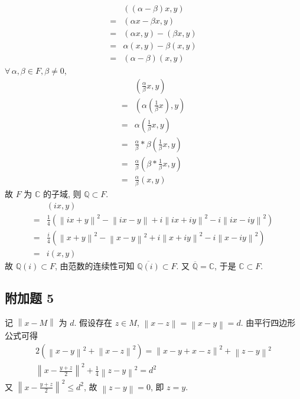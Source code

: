 \documentclass[../main.tex]{subfiles}
\begin{document}
\begin{align*}
     & \left( \left( \alpha - \beta \right) x , y \right) \\
    =& \left( \alpha x - \beta x , y \right) \\
    =& \left( \alpha x, y \right) - \left( \beta x, y \right) \\
    =& \alpha \left( x, y \right) - \beta \left( x, y \right) \\
    =& \left( \alpha - \beta \right) \left( x, y \right)
\end{align*}
$\forall \, \alpha, \beta \in F, \beta \neq 0$,
\begin{align*}
     & \left( \frac{\alpha}{\beta} x, y \right) \\
    =& \left( \alpha \left( \frac{1}{\beta} x \right) , y \right) \\
    =& \alpha \left( \frac{1}{\beta} x , y \right) \\
    =& \frac{\alpha}{\beta} * \beta \left( \frac{1}{\beta} x, y \right) \\
    =& \frac{\alpha}{\beta} \left( \beta * \frac{1}{\beta} x, y \right) \\
    =& \frac{\alpha}{\beta} \left( x, y \right)
\end{align*}
故 $F$ 为 $\mathbb{C}$ 的子域, 则 $\mathbb{Q} \subset F$.
\begin{align*}
     & \left( i x, y \right) \\
    =& \frac{1}{4} \left( \left\| i x + y \right\|^2 - \left\| ix - y \right\| + i \left\| i x + i y \right\|^2 - i \left\| i x - i y \right\|^2 \right) \\
    =& \frac{i}{4} \left( \left\| x + y \right\|^2 - \left\| x - y \right\|^2 + i \left\| x + i y \right\|^2 - i \left\| x - i y \right\|^2 \right) \\
    =& i \left( x, y \right)
\end{align*}
故 $\mathbb{Q} \left( i \right) \subset F$, 由范数的连续性可知 $\overline{\mathbb{Q} \left( i \right)} \subset F$.
又 $\overline{\mathbb{Q}} = \mathbb{C}$, 于是 $\mathbb{C} \subset F$.

\subsection{附加题 5}
记 $\left\| x - M \right\|$ 为 $d$.
假设存在 $z \in M$, $\left\| x - z \right\| = \left\| x - y \right\| = d$.
由平行四边形公式可得
\begin{gather*}
    2 \left( \left\| x - y \right\|^2 + \left\| x - z \right\|^2 \right)
    =
    \left\| x - y + x - z \right\|^2 + \left\| z - y \right\|^2 \\
    \left\| x - \frac{y + z}{2} \right\|^2 + \frac{1}{4} \left\| z - y \right\|^2
    =
    d^2
\end{gather*}
又 $\left\| x - \displaystyle \frac{y + z}{2} \right\|^2 \leqslant d^2$, 故 $\left\| z - y \right\| = 0$, 即 $z = y$.
\end{document}
